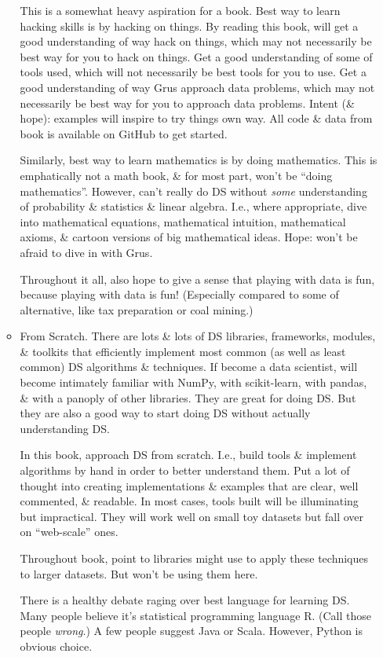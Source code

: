 \documentclass{article}
\begin{document}
\begin{itemize}
\begin{itemize}
		This is a somewhat heavy aspiration for a book. Best way to learn hacking skills is by hacking on things. By reading this book, will get a good understanding of way hack on things, which may not necessarily be best way for you to hack on things. Get a good understanding of some of tools used, which will not necessarily be best tools for you to use. Get a good understanding of way {\sc Grus} approach data problems, which may not necessarily be best way for you to approach data problems. Intent (\& hope): examples will inspire to try things own way. All code \& data from book is available on GitHub to get started.
		
		Similarly, best way to learn mathematics is by doing mathematics. This is emphatically not a math book, \& for most part, won't be ``doing mathematics''. However, can't really do DS without {\it some} understanding of probability \& statistics \& linear algebra. I.e., where appropriate, dive into mathematical equations, mathematical intuition, mathematical axioms, \& cartoon versions of big mathematical ideas. Hope: won't be afraid to dive in with {\sc Grus}.
		
		Throughout it all, also hope to give a sense that playing with data is fun, because playing with data is fun! (Especially compared to some of alternative, like tax preparation or coal mining.)
		\item {\sf From Scratch.} There are lots \& lots of DS libraries, frameworks, modules, \& toolkits that efficiently implement most common (as well as least common) DS algorithms \& techniques. If become a data scientist, will become intimately familiar with NumPy, with scikit-learn, with pandas, \& with a panoply of other libraries. They are great for doing DS. But they are also a good way to start doing DS without actually understanding DS.
		
		In this book, approach DS from scratch. I.e., build tools \& implement algorithms by hand in order to better understand them. Put a lot of thought into creating implementations \& examples that are clear, well commented, \& readable. In most cases, tools built will be illuminating but impractical. They will work well on small toy datasets but fall over on ``web-scale'' ones.
		
		Throughout book, point to libraries might use to apply these techniques to larger datasets. But won't be using them here.
		
		There is a healthy debate raging over best language for learning DS. Many people believe it's statistical programming language R. (Call those people {\it wrong}.) A few people suggest Java or Scala. However, Python is obvious choice.
		

\end{itemize}
\end{itemize}
\end{document}
